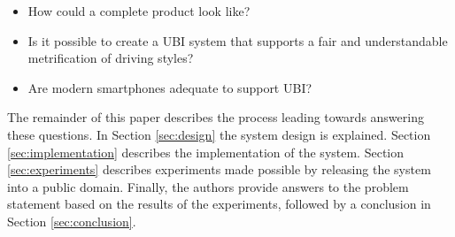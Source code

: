 \begin{itemize}
\item How could a complete product look like?
\item Is it possible to create a UBI system that supports a fair and understandable metrification of driving styles?
\item Are modern smartphones adequate to support UBI?

\end{itemize}

The remainder of this paper describes the process leading towards answering these questions. In Section \ref{sec:design} the system design is explained. Section \ref{sec:implementation} describes the implementation of the system. Section \ref{sec:experiments} describes experiments made possible by releasing the system into a public domain. Finally, the authors provide answers to the problem statement based on the results of the experiments, followed by a conclusion in Section \ref{sec:conclusion}.


